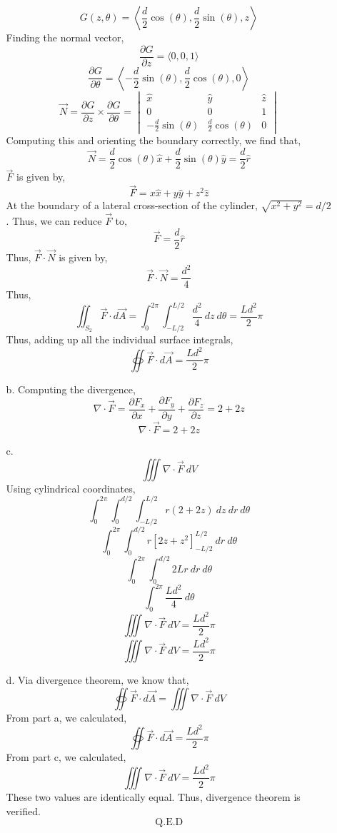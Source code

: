 \documentclass[12pt]{article}
\begin{document}
\begin{enumerate}
\begin{enumerate}
		\[G(z, \theta)=\left\langle \frac{d}{2}\cos(\theta),\frac{d}{2}\sin(\theta),z\right\rangle\]
		Finding the normal vector,
		\[\frac{\partial G}{\partial z}=\langle 0, 0, 1\rangle\]
		\[\frac{\partial G}{\partial \theta} = \left\langle -\frac{d}{2}\sin(\theta),\frac{d}{2}\cos(\theta),0 \right\rangle\]
		\[\vec N = \frac{\partial G}{\partial z}\times \frac{\partial G}{\partial \theta}=\begin{vmatrix}
			\hat x & \hat y & \hat z \\ 
			0 & 0 & 1 \\ 
			-\frac{d}{2}\sin(\theta) & \frac{d}{2}\cos(\theta) & 0	
		\end{vmatrix}\]
		Computing this and orienting the boundary correctly, we find that,
		\[\vec N = \frac{d}{2}\cos(\theta)\hat x + \frac{d}{2}\sin(\theta)\hat y=\frac{d}{2}\hat r\]
		$\vec F$ is given by,
		\[\vec F = x\hat x + y\hat y+z^2\hat z\]
		At the boundary of a lateral cross-section of the cylinder, $\sqrt{x^2+y^2}=d/2$.
		Thus, we can reduce $\vec F$ to,
		\[\vec F=\frac{d}{2}\hat r\]
		Thus, $\vec F \cdot \vec N$ is given by,
		\[\vec F \cdot \vec N = \frac{d^2}{4}\]
		Thus,
		\[\iint_{S_2}\vec F \cdot d\vec A = \int_0^{2\pi}\int_{-L/2}^{L/2}\frac{d^2}{4}\:dz\:d\theta=\frac{Ld^2}{2}\pi\]
		Thus, adding up all the individual surface integrals,
		\[\boxed{\oiint \vec F \cdot d\vec A =\frac{Ld^2}{2}\pi}\]

		\item [b.]
		Computing the divergence,
		\[\nabla \cdot \vec F = \frac{\partial F_x}{\partial x}+\frac{\partial F_y}{\partial y}+\frac{\partial F_z}{\partial z}=2+2z\]
		\[\boxed{\nabla \cdot \vec F = 2+2z}\]

		\item [c.]
		\[\iiint \nabla \cdot \vec F \: dV\]
		Using cylindrical coordinates,
		\[\int_0^{2\pi}\int_0^{d/2}\int_{-L/2}^{L/2}r(2+2z)\:dz\:dr\:d\theta\]
		\[\int_0^{2\pi}\int_0^{d/2}r\left[2z+z^2\right]_{-L/2}^{L/2}\:dr\:d\theta\]
		\[\int_0^{2\pi}\int_0^{d/2}2Lr\:dr\:d\theta\]
		\[\int_0^{2\pi}\frac{Ld^2}{4}\:d\theta\]
		\[\iiint \nabla \cdot \vec F \: dV = \frac{Ld^2}{2}\pi\]
		\[\boxed{\iiint \nabla \cdot \vec F \: dV = \frac{Ld^2}{2}\pi}\]

		\item [d.]
		Via divergence theorem, we know that,
		\[\oiint \vec F \cdot d\vec A = \iiint \nabla \cdot \vec F \: dV\]
		From part a, we calculated,
		\[\oiint \vec F \cdot d\vec A =\frac{Ld^2}{2}\pi\]
		From part c, we calculated,
		\[\iiint \nabla \cdot \vec F \: dV = \frac{Ld^2}{2}\pi\]
		These two values are identically equal.
		Thus, divergence theorem is verified.
		\[\boxed{\text{Q.E.D}}\]


\end{enumerate}
\end{enumerate}
\end{document}
